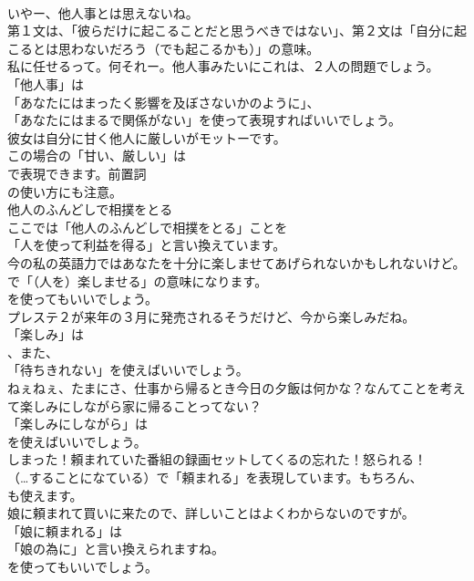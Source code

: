 \documentclass[8pt]{extreport}
\begin{document}
\begin{CJK}{UTF8}{min}
\\	いやー、他人事とは思えないね。 
\\	第１文は、「彼らだけに起こることだと思うべきではない」、第２文は「自分に起こるとは思わないだろう（でも起こるかも）」の意味。	
\\	私に任せるって。何それー。他人事みたいにこれは、２人の問題でしょう。 
\\	「他人事」は
\\	「あなたにはまったく影響を及ぼさないかのように」、
\\	「あなたにはまるで関係がない」を使って表現すればいいでしょう。	
\\	彼女は自分に甘く他人に厳しいがモットーです。 
\\	この場合の「甘い、厳しい」は 
\\	で表現できます。前置詞 
\\	の使い方にも注意。	
\\	他人のふんどしで相撲をとる 
\\	ここでは「他人のふんどしで相撲をとる」ことを
\\	「人を使って利益を得る」と言い換えています。	
\\	今の私の英語力ではあなたを十分に楽しませてあげられないかもしれないけど。 
\\	で「（人を）楽しませる」の意味になります。
\\	を使ってもいいでしょう。	
\\	プレステ２が来年の３月に発売されるそうだけど、今から楽しみだね。 
\\	「楽しみ」は
\\	、また、
\\	「待ちきれない」を使えばいいでしょう。	
\\	ねぇねぇ、たまにさ、仕事から帰るとき今日の夕飯は何かな？なんてことを考えて楽しみにしながら家に帰ることってない？ 
\\	「楽しみにしながら」は 
\\	を使えばいいでしょう。	
\\	しまった！頼まれていた番組の録画セットしてくるの忘れた！怒られる！ 
\\	（…することになている）で「頼まれる」を表現しています。もちろん、
\\	も使えます。	
\\	娘に頼まれて買いに来たので、詳しいことはよくわからないのですが。 
\\	「娘に頼まれる」は
\\	「娘の為に」と言い換えられますね。
\\	を使ってもいいでしょう。	

\end{CJK}
\end{document}
